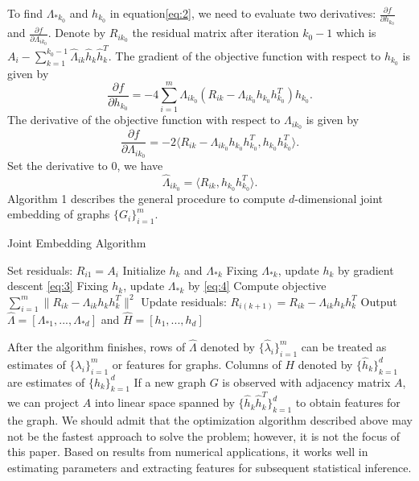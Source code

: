 \documentclass[10pt,journal,compsoc]{IEEEtran}
\begin{document}
\noindent To find $\Lambda_{*k_0}$ and $h_{k_0}$ in equation\ref{eq:2}, we need to evaluate two derivatives: $\frac{\partial f}{\partial h_{k_0}}$ and $\frac{\partial f}{\partial \Lambda_{i k_0}}$. Denote by $R_{ik_0}$ the residual matrix after iteration $k_0-1$ which is $A_i- \sum\limits_{k=1}^{k_0-1}\hat{\Lambda}_{ik} \hat{h}_{k} \hat{h}_{k}^T$. The gradient of the objective function with respect to $h_{k_0}$ is given by
\begin{equation} \label{eq:3}
\frac{\partial f}{\partial h_{k_0}} = -4\sum\limits_{i=1}^{m}  \Lambda_{ik_0} (R_{ik}-\Lambda_{ik_0} h_{k_0} h_{k_0}^T)  h_{k_0}.
\end{equation}
The derivative of the objective function with respect to $\Lambda_{i k_0}$ is given by
\[\frac{\partial f}{\partial \Lambda_{i k_0}}= -2 \langle R_{ik}-\Lambda_{ik_0} h_{k_0} h_{k_0}^T,h_{k_0} h_{k_0}^T\rangle.\]
Set the derivative to $0$, we have
\begin{equation}  \label{eq:4}
\hat{\Lambda}_{i k_0} = \langle R_{ik}, h_{k_0} h_{k_0}^T \rangle.
\end{equation}
Algorithm 1 describes the general procedure to compute $d$-dimensional joint embedding of graphs $\{G_i\}_{i=1}^m$. 

\begin{algorithm}
	\caption{Joint Embedding Algorithm}
	\begin{algorithmic}[1]
		\State Set residuals: $R_{i1}=A_i$
		\State Initialize $h_k$ and $\Lambda_{*k}$ 
		\State Fixing $\Lambda_{*k}$, update $h_k$ by gradient descent \eqref{eq:3}
		\State Fixing $h_k$, update $\Lambda_{*k}$ by \eqref{eq:4}
		\State Compute objective $\sum\limits_{i=1}^{m} \| R_{ik}-  \Lambda_{ik} h_k h_k^T \|^2$
		\EndWhile
		\State Update residuals: $R_{i(k+1)}=R_{ik}- \Lambda_{ik} h_kh_k^T$
		\EndFor
		\State Output $\hat{\Lambda}=[\Lambda_{*1},...,\Lambda_{*d}]$ and $\hat{H}=[h_1,...,h_d]$
		\EndProcedure
	\end{algorithmic}
\end{algorithm}

\noindent After the algorithm finishes, rows of $\hat{\Lambda}$ denoted by $\{\hat{\lambda}_i\}_{i=1}^m$ can be treated as estimates of $\{\lambda_i\}_{i=1}^m$ or features for graphs. Columns of $H$ denoted by $\{\hat{h}_k\}_{k=1}^d$ are estimates of $\{h_k\}_{k=1}^d$ If a new graph $G$ is observed with adjacency matrix $A$, we can project $A$ into linear space spanned by $\{\hat{h}_k \hat{h}_k^T\}_{k=1}^{d}$ to obtain features for the graph. We should admit that the optimization algorithm described above may not be the fastest approach to solve the problem; however, it is not the focus of this paper. Based on results from numerical applications, it works well in estimating parameters and extracting features for subsequent statistical inference.
\end{document}
